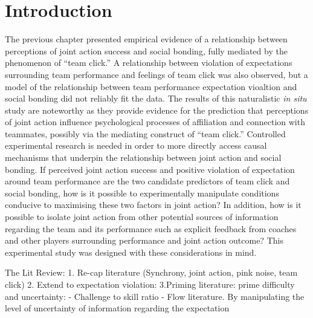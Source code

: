 \documentclass[english]{article}\usepackage[]{graphicx}\usepackage[]{color}
\begin{document}
%



















\section{Introduction}

The previous chapter presented empirical evidence of a relationship between perceptions of joint action success and social bonding, fully mediated by the phenomenon of ``team click.'' A relationship between violation of expectations surrounding team performance and feelings of team click was also observed, but a model of the relationship between team performance expectation vioaltion and social bonding did not reliably fit the data.  The results of this naturalistic \textit{in situ} study are noteworthy as they provide evidence for the prediction that perceptions of joint action influence psychological processes of affiliation and connection with teammates, possibly via the mediating construct of ``team click.''  Controlled experimental research is needed in order to more directly access causal mechanisms that underpin the relationship between joint action and social bonding.  If perceived joint action success and positive violation of expectation around team performance are the two candidate predictors of team click and social bonding, how is it possible to experimentally manipulate conditions conducive to maximising these two factors in joint action? In addition, how is it possible to isolate joint action from other potential sources of information regarding the team and its performance such as explicit feedback from coaches and other players surrounding performance and joint action outcome? This experimental study was designed with these considerations in mind.

The Lit Review:
1. Re-cap literature (Synchrony, joint action, pink noise, team click)
2. Extend to expectation violation:
3.Priming literature: prime difficulty and uncertainty:
- Challenge to skill ratio - Flow literature.
By manipulating the level of uncertainty of information regarding the expectation
\end{document}
